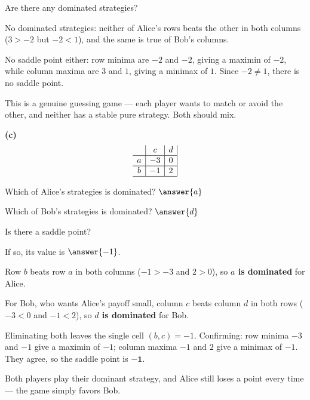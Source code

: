\documentclass[12pt]{ximera}
\begin{document}
\begin{problem}
\begin{prompt}
Are there any dominated strategies?
\begin{multipleChoice}
\end{multipleChoice}

\begin{feedback}
No dominated strategies: neither of Alice's rows beats the other in both columns
($3 > -2$ but $-2 < 1$), and the same is true of Bob's columns.

No saddle point either: row minima are $-2$ and $-2$, giving a maximin of $-2$, while
column maxima are $3$ and $1$, giving a minimax of $1$. Since $-2 \neq 1$, there is no
saddle point.

This is a genuine guessing game --- each player wants to match or avoid the other, and
neither has a stable pure strategy. Both should mix.
\end{feedback}
\end{prompt}

\begin{prompt}
\textbf{(c)}
\[
\begin{array}{c|c|c|}
\phantom{|} & c & d \\\hline
a & -3 & 0 \\\hline
b & -1 & 2 \\\hline
\end{array}
\]

Which of Alice's strategies is dominated? $\answer{a}$

\smallskip
Which of Bob's strategies is dominated? $\answer{d}$

\smallskip
Is there a saddle point?
\begin{multipleChoice}
\end{multipleChoice}
If so, its value is $\answer{-1}$.

\begin{feedback}
Row $b$ beats row $a$ in both columns ($-1 > -3$ and $2 > 0$), so \textbf{$a$ is
dominated} for Alice.

For Bob, who wants Alice's payoff small, column $c$ beats column $d$ in both rows
($-3 < 0$ and $-1 < 2$), so \textbf{$d$ is dominated} for Bob.

Eliminating both leaves the single cell $(b,c) = -1$. Confirming: row minima $-3$ and
$-1$ give a maximin of $-1$; column maxima $-1$ and $2$ give a minimax of $-1$. They
agree, so the saddle point is $\mathbf{-1}$.

Both players play their dominant strategy, and Alice still loses a point every time ---
the game simply favors Bob.
\end{feedback}
\end{prompt}
\end{problem}
\end{document}
